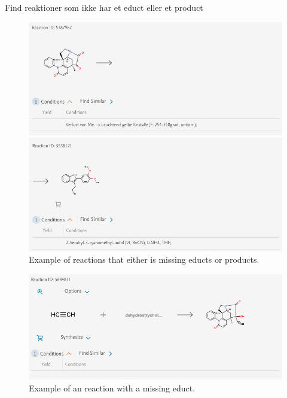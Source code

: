 \documentclass[a4paper,10pt,titlepage]{paper}
\begin{document}
Find reaktioner som ikke har et educt eller et product

\begin{figure}[H]
\hspace{-1cm}
\includegraphics[scale=0.5]{Billeder/LeftOnlyReaction.png}

\hspace{-1cm}
\includegraphics[scale=0.5]{Billeder/RightOnlyReaction.png}
\caption{Example of reactions that either is missing educts or products.}
\end{figure}

\begin{figure}[H]
\hspace{-1cm}
\includegraphics[scale=0.5]{Billeder/MissingIngredientReaction.png}
\caption{Example of an reaction with a missing educt.}
\end{figure}
\end{document}
